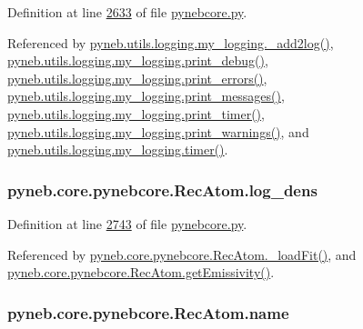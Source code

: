 Definition at line \hyperlink{pynebcore_8py_source_l02633}{2633} of file \hyperlink{pynebcore_8py_source}{pynebcore.\-py}.



Referenced by \hyperlink{logging_8py_source_l00059}{pyneb.\-utils.\-logging.\-my\-\_\-logging.\-\_\-add2log()}, \hyperlink{logging_8py_source_l00157}{pyneb.\-utils.\-logging.\-my\-\_\-logging.\-print\-\_\-debug()}, \hyperlink{logging_8py_source_l00149}{pyneb.\-utils.\-logging.\-my\-\_\-logging.\-print\-\_\-errors()}, \hyperlink{logging_8py_source_l00133}{pyneb.\-utils.\-logging.\-my\-\_\-logging.\-print\-\_\-messages()}, \hyperlink{logging_8py_source_l00165}{pyneb.\-utils.\-logging.\-my\-\_\-logging.\-print\-\_\-timer()}, \hyperlink{logging_8py_source_l00141}{pyneb.\-utils.\-logging.\-my\-\_\-logging.\-print\-\_\-warnings()}, and \hyperlink{logging_8py_source_l00115}{pyneb.\-utils.\-logging.\-my\-\_\-logging.\-timer()}.

\hypertarget{classpyneb_1_1core_1_1pynebcore_1_1_rec_atom_ac93e76934d279878d4f1f6d961df5488}{
\subsubsection[{log\-\_\-dens}]{\setlength{\rightskip}{0pt plus 5cm}pyneb.\-core.\-pynebcore.\-Rec\-Atom.\-log\-\_\-dens}}\label{classpyneb_1_1core_1_1pynebcore_1_1_rec_atom_ac93e76934d279878d4f1f6d961df5488}


Definition at line \hyperlink{pynebcore_8py_source_l02743}{2743} of file \hyperlink{pynebcore_8py_source}{pynebcore.\-py}.



Referenced by \hyperlink{pynebcore_8py_source_l02754}{pyneb.\-core.\-pynebcore.\-Rec\-Atom.\-\_\-load\-Fit()}, and \hyperlink{pynebcore_8py_source_l02990}{pyneb.\-core.\-pynebcore.\-Rec\-Atom.\-get\-Emissivity()}.

\hypertarget{classpyneb_1_1core_1_1pynebcore_1_1_rec_atom_abde95b732830df56b3d7713313f83060}{
\subsubsection[{name}]{\setlength{\rightskip}{0pt plus 5cm}pyneb.\-core.\-pynebcore.\-Rec\-Atom.\-name}}\label{classpyneb_1_1core_1_1pynebcore_1_1_rec_atom_abde95b732830df56b3d7713313f83060}


